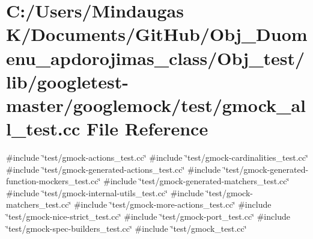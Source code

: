 \hypertarget{_obj__test_2lib_2googletest-master_2googlemock_2test_2gmock__all__test_8cc}{}\section{C\+:/\+Users/\+Mindaugas K/\+Documents/\+Git\+Hub/\+Obj\+\_\+\+Duomenu\+\_\+apdorojimas\+\_\+class/\+Obj\+\_\+test/lib/googletest-\/master/googlemock/test/gmock\+\_\+all\+\_\+test.cc File Reference}
\label{_obj__test_2lib_2googletest-master_2googlemock_2test_2gmock__all__test_8cc}
{\ttfamily \#include \char`\"{}test/gmock-\/actions\+\_\+test.\+cc\char`\"{}}\newline
{\ttfamily \#include \char`\"{}test/gmock-\/cardinalities\+\_\+test.\+cc\char`\"{}}\newline
{\ttfamily \#include \char`\"{}test/gmock-\/generated-\/actions\+\_\+test.\+cc\char`\"{}}\newline
{\ttfamily \#include \char`\"{}test/gmock-\/generated-\/function-\/mockers\+\_\+test.\+cc\char`\"{}}\newline
{\ttfamily \#include \char`\"{}test/gmock-\/generated-\/matchers\+\_\+test.\+cc\char`\"{}}\newline
{\ttfamily \#include \char`\"{}test/gmock-\/internal-\/utils\+\_\+test.\+cc\char`\"{}}\newline
{\ttfamily \#include \char`\"{}test/gmock-\/matchers\+\_\+test.\+cc\char`\"{}}\newline
{\ttfamily \#include \char`\"{}test/gmock-\/more-\/actions\+\_\+test.\+cc\char`\"{}}\newline
{\ttfamily \#include \char`\"{}test/gmock-\/nice-\/strict\+\_\+test.\+cc\char`\"{}}\newline
{\ttfamily \#include \char`\"{}test/gmock-\/port\+\_\+test.\+cc\char`\"{}}\newline
{\ttfamily \#include \char`\"{}test/gmock-\/spec-\/builders\+\_\+test.\+cc\char`\"{}}\newline
{\ttfamily \#include \char`\"{}test/gmock\+\_\+test.\+cc\char`\"{}}\newline
